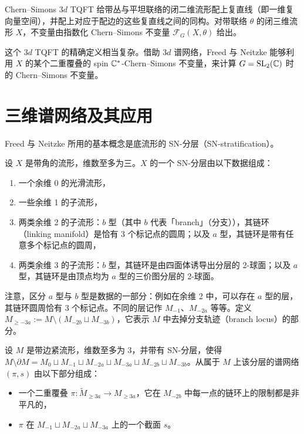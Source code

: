 Chern–Simons $3d$ TQFT 给带丛与平坦联络的闭二维流形配上复直线（即一维复向量空间），并配上对应于配边的这些复直线之间的同构。对带联络 $\theta$ 的闭三维流形 $X$，不变量由指数化 Chern–Simons 不变量 $\mathcal{F}_G(X,\theta)$ 给出。

这个 $3d$ TQFT 的精确定义相当复杂。借助 $3d$ 谱网络，Freed 与 Neitzke 能够利用 $X$ 的某个二重覆叠的 spin $\mathbb{C}^*$-Chern–Simons 不变量，来计算 $G=\operatorname{SL}_2(\mathbb{C})$ 时的 Chern–Simons 不变量。

\section{三维谱网络及其应用}

Freed 与 Neitzke 所用的基本概念是底流形的 SN-分层（SN-stratification）。

\begin{definition}[{{{{{[138, 定义 4.15]}}}}}]
设 $X$ 是带角的流形，维数至多为三。$X$ 的一个 SN-分层由以下数据组成：
\begin{enumerate}
\item 一个余维 0 的光滑流形，
\item 一些余维 1 的子流形，
\item 两类余维 2 的子流形：$b$ 型（其中 $b$ 代表「branch」（分支）），其链环（linking manifold）是恰有 3 个标记点的圆周；以及 $a$ 型，其链环是带有任意多个标记点的圆周，
\item 两类余维 3 的子流形：$b$ 型，其链环是由四面体诱导出分层的 2-球面；以及 $a$ 型，其链环是由顶点均为 $a$ 型的三价图分层的 2-球面。
\end{enumerate}
\end{definition}

注意，区分 $a$ 型与 $b$ 型是数据的一部分：例如在余维 2 中，可以存在 $a$ 型的层，其链环圆周恰有 3 个标记点。不同的层记作 $M_{-1}$、$M_{-2a}$ 等等。定义 $M_{\ge -3a}:=M\setminus(M_{-2b}\sqcup M_{-3b})$，它表示 $M$ 中去掉分支轨迹（branch locus）的部分。

\begin{definition}[{{{{{[138, 定义 4.24 (i)]}}}}}]
设 $M$ 是带边紧流形，维数至多为 3，并带有 SN-分层，使得 $M\setminus\partial M=M_0\sqcup M_{-1}\sqcup M_{-2a}\sqcup M_{-3a}\sqcup M_{-2b}\sqcup M_{-3b}$。从属于 $M$ 上该分层的谱网络 $(\pi,s)$ 由以下部分组成：
\begin{itemize}
\item 一个二重覆叠 $\pi:\widetilde{M}_{\ge 3a}\to M_{\ge 3a}$，它在 $M_{-2b}$ 中每一点的链环上的限制都是非平凡的，
\item $\pi$ 在 $M_{-1}\sqcup M_{-2a}\sqcup M_{-3a}$ 上的一个截面 $s$。
\end{itemize}
\end{definition}


